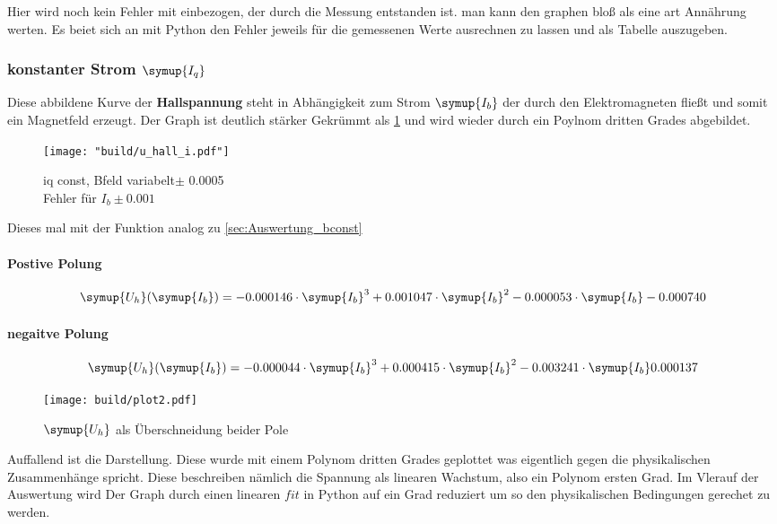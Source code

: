 Hier wird noch kein Fehler mit einbezogen, der durch die Messung entstanden ist. man kann den graphen bloß als eine art Annährung werten. 
Es beiet sich an mit Python den Fehler jeweils für die gemessenen Werte ausrechnen zu lassen und als Tabelle auszugeben.


\subsubsection{konstanter Strom $\symup{I_q}$}
\label{sec:Auswertung_iconst}

Diese abbildene Kurve der \textbf{Hallspannung} steht in Abhängigkeit zum Strom $\symup{I_b}$ der durch den Elektromagneten fließt und somit ein Magnetfeld erzeugt.
Der Graph ist deutlich stärker Gekrümmt als \ref{fig:Uhall} und wird wieder durch ein Poylnom dritten Grades abgebildet. 


\begin{figure}
   \centering
    \texttt{[image: "build/u\_hall\_i.pdf"]}
    \caption{iq const, Bfeld variabelt$\pm$ 0.0005\\Fehler für $I_b \pm 0.001$}
    \label{fig:Uhall}
 \end{figure}



Dieses mal mit der Funktion analog zu \ref{sec:Auswertung_bconst}
\paragraph{Postive Polung}


\begin{equation}
   \symup{U_h}(\symup{I_b})=-0.000146 \cdot \symup{I_b}^3 + 0.001047\cdot\symup{I_b}^2 -0.000053\cdot\symup{I_b} -0.000740
\end{equation}

\paragraph{negaitve Polung}

\begin{equation}
   \symup{U_h}(\symup{I_b})=-0.000044 \cdot \symup{I_b}^3 + 0.000415\cdot\symup{I_b}^2 -0.003241\cdot\symup{I_b} 0.000137
\end{equation}

\begin{figure}[!h]
   \centering
   \texttt{[image: build/plot2.pdf]} %
   \caption{$\symup{U_h}$ als Überschneidung beider Pole}
   \label{fig:auswertunghall}
\end{figure}

Auffallend ist die Darstellung. Diese wurde mit einem Polynom dritten Grades geplottet was eigentlich gegen die physikalischen Zusammenhänge
spricht. Diese beschreiben nämlich die Spannung als linearen Wachstum, also ein Polynom ersten Grad. Im Vlerauf der Auswertung wird Der Graph durch einen linearen $fit$
in Python auf ein Grad reduziert um so den physikalischen Bedingungen gerechet zu werden.



%
